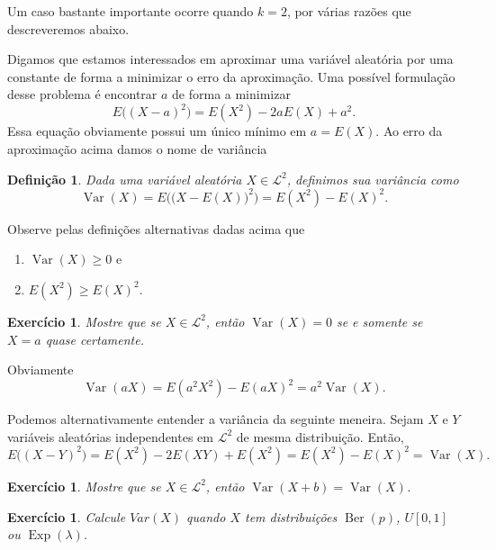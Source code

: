 \documentclass[reqno, draft]{book}
\newcommand*\1{\mathds{1}}
\newtheorem{definition}[theorem]{Definição}
\newtheorem{exercise}[example]{Exercício}
\DeclareMathOperator{\Var}{Var}
\DeclareMathOperator{\Ber}{Ber}
\DeclareMathOperator{\Exp}{Exp}
\begin{document}
Um caso bastante importante ocorre quando $k = 2$, por várias razões que descreveremos abaixo.

Digamos que estamos interessados em aproximar uma variável aleatória por uma constante de forma a minimizar o erro da aproximação.
Uma possível formulação desse problema é encontrar $a$ de forma a minimizar
\begin{equation}
  E\Big( (X - a)^2 \Big) = E(X^2) - 2 a E(X) + a^2.
\end{equation}
Essa equação obviamente possui um único mínimo em $a = E(X)$.
Ao erro da aproximação acima damos o nome de variância

\begin{definition}
  Dada uma variável aleatória $X \in \mathcal{L}^2$, definimos sua variância  como
  \begin{equation}
    \Var(X) = E \Big( \big(X - E(X)\big)^2 \Big) = E(X^2) - E(X)^2.
  \end{equation}
\end{definition}

Observe pelas definições alternativas dadas acima que
\begin{enumerate}[\quad a)]
\item $\Var(X) \geq 0$ e
\item $E(X^2) \geq E(X)^2$.
\end{enumerate}

\begin{exercise}
  Mostre que se $X \in \mathcal{L}^2$, então $\Var(X) = 0$ se e somente se $X = a$ quase certamente.
\end{exercise}

Obviamente
\begin{equation}
  \Var(a X) = E(a^2 X^2) - E(aX)^2 = a^2 \Var(X).
\end{equation}

Podemos alternativamente entender a variância da seguinte meneira.
Sejam $X$ e $Y$ variáveis aleatórias independentes em $\mathcal{L}^2$ de mesma distribuição.
Então,
\begin{equation}
  E\big( (X - Y)^2 \big) = E(X^2) - 2 E(XY) + E(X^2) = E(X^2) - E(X)^2 = \Var(X).
\end{equation}

\begin{exercise}
  Mostre que se $X \in \mathcal{L}^2$, então $\Var(X + b) = \Var(X)$.
\end{exercise}

\begin{exercise}
  Calcule $Var(X)$ quando $X$ tem distribuições $\Ber(p)$, $U[0,1]$ ou $\Exp(\lambda)$.
\end{exercise}
\end{document}
